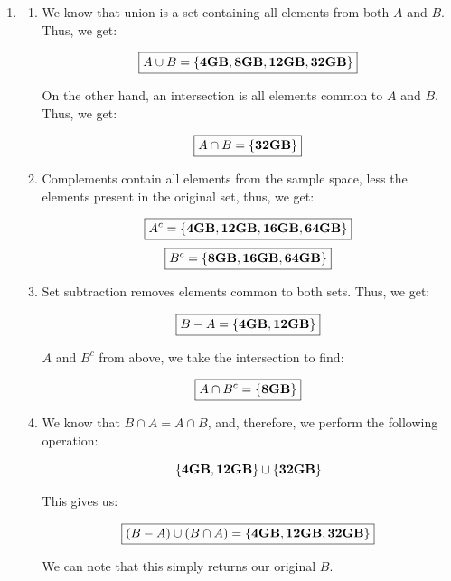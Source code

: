 \begin{enumerate}

  \item 

    \begin{enumerate}

      \item We know that union is a set containing all elements from both $A$ and $B$. Thus, we get:

        $$\boxed{A\cup B=\left\{ \bold{4\text{\textbf{GB}},8\text{\textbf{GB}},12\text{\textbf{GB}},32\text{\textbf{GB}}} \right\}}$$

        On the other hand, an intersection is all elements common to $A$ and $B$. Thus, we get:

        $$\boxed{A\cap B=\left\{ \bold{32\text{\textbf{GB}}} \right\}}$$

      \item Complements contain all elements from the sample space, less the elements present in the original set, thus, we get:

        $$\boxed{A^c=\left\{ \bold{4}\text{\textbf{GB}}, \bold{12}\text{\textbf{GB}}, \bold{16}\text{\textbf{GB}}, \bold{64}\text{\textbf{GB}} \right\}}$$
        $$\boxed{B^c=\left\{ \bold{8}\text{\textbf{GB}}, \bold{16}\text{\textbf{GB}}, \bold{64}\text{\textbf{GB}} \right\}}$$

      \item Set subtraction removes elements common to both sets. Thus, we get:

        $$\boxed{B-A=\left\{ \bold{4}\text{\textbf{GB}},\bold{12}\text{\textbf{GB}} \right\}}$$

        $A$ and $B^c$ from above, we take the intersection to find:

        $$\boxed{A\cap B^c=\left\{ \bold{8}\text{\textbf{GB}}\right\}}$$

      \item We know that $B\cap A= A\cap B$, and, therefore, we perform the following operation:

        $$\left\{ \bold{4}\text{\textbf{GB}},\bold{12}\text{\textbf{GB}} \right\}\cup \left\{ \bold{32\text{\textbf{GB}}} \right\}$$

        This gives us:

        $$\boxed{(B-A)\cup (B\cap A)=\left\{ \bold{4}\text{\textbf{GB}},\bold{12}\text{\textbf{GB}}, \bold{32}\text{\textbf{GB}} \right\}}$$

        We can note that this simply returns our original $B$.


\end{enumerate}
\end{enumerate}
